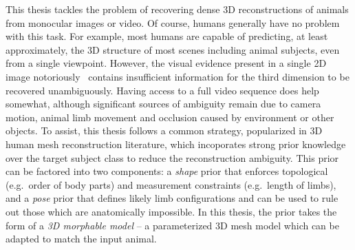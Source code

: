 
This thesis tackles the problem of recovering dense 3D reconstructions of animals from monocular images or video. Of course, humans generally have no problem with this task. For example, most humans are capable of predicting, at least approximately, the 3D structure of most scenes including animal subjects, even from a single viewpoint. However, the visual evidence present in a single 2D image notoriously~\citep{Faugeras01geometry} contains insufficient information for the third dimension to be recovered unambiguously. Having access to a full video sequence does help somewhat, although significant sources of ambiguity remain due to camera motion, animal limb movement and occlusion caused by environment or other objects. 
To assist, this thesis follows a common strategy, popularized in 3D human mesh reconstruction literature, which incoporates strong prior knowledge over the target subject class to reduce the reconstruction ambiguity. This prior can be factored into two components: a \emph{shape} prior that enforces topological (e.g.\ order of body parts) and measurement constraints (e.g.\ length of limbs), and a \emph{pose} prior that defines likely limb configurations and can be used to rule out those which are anatomically impossible. 
In this thesis, the prior takes the form of a \emph{3D morphable model} -- a parameterized 3D mesh model which can be adapted to match the input animal.

